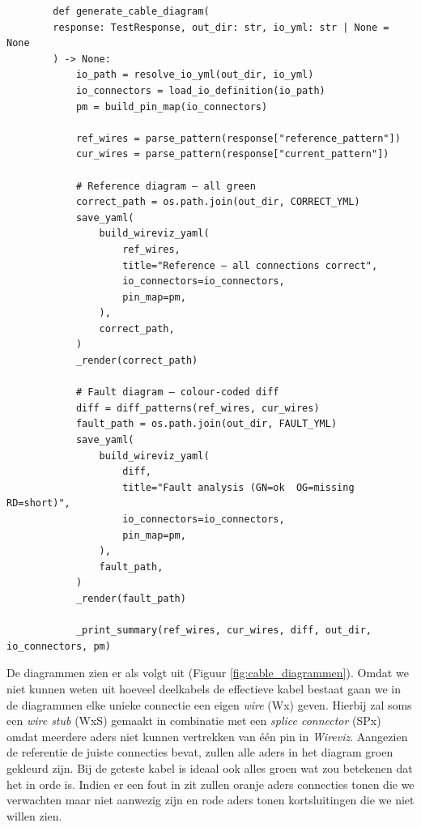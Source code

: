 \begin{listing}[H]
    \begin{verbatim}
        def generate_cable_diagram(
        response: TestResponse, out_dir: str, io_yml: str | None = None
        ) -> None:
            io_path = resolve_io_yml(out_dir, io_yml)
            io_connectors = load_io_definition(io_path)
            pm = build_pin_map(io_connectors)
            
            ref_wires = parse_pattern(response["reference_pattern"])
            cur_wires = parse_pattern(response["current_pattern"])
            
            # Reference diagram — all green
            correct_path = os.path.join(out_dir, CORRECT_YML)
            save_yaml(
                build_wireviz_yaml(
                    ref_wires,
                    title="Reference — all connections correct",
                    io_connectors=io_connectors,
                    pin_map=pm,
                ),
                correct_path,
            )
            _render(correct_path)
            
            # Fault diagram — colour-coded diff
            diff = diff_patterns(ref_wires, cur_wires)
            fault_path = os.path.join(out_dir, FAULT_YML)
            save_yaml(
                build_wireviz_yaml(
                    diff,
                    title="Fault analysis (GN=ok  OG=missing  RD=short)",
                    io_connectors=io_connectors,
                    pin_map=pm,
                ),
                fault_path,
            )
            _render(fault_path)
            
            _print_summary(ref_wires, cur_wires, diff, out_dir, io_connectors, pm)
    \end{verbatim}
    \caption[Wireviz generate cable diagram]{Code van de functie die de diagrammen maakt.}
    \label{cf:generate_cable_diagram}
\end{listing}

De diagrammen zien er als volgt uit (Figuur \ref{fig:cable_diagrammen}). Omdat we niet kunnen weten uit hoeveel deelkabels de effectieve kabel bestaat gaan we in de diagrammen elke unieke connectie een eigen \textit{wire} (Wx) geven. Hierbij zal soms een \textit{wire stub} (WxS) gemaakt in combinatie met een \textit{splice connector} (SPx) omdat meerdere aders niet kunnen vertrekken van één pin in \textit{Wireviz}. Aangezien de referentie de juiste connecties bevat, zullen alle aders in het diagram groen gekleurd zijn. Bij de geteste kabel is ideaal ook alles groen wat zou betekenen dat het in orde is. Indien er een fout in zit zullen oranje aders connecties tonen die we verwachten maar niet aanwezig zijn en rode aders tonen kortsluitingen die we niet willen zien. 

